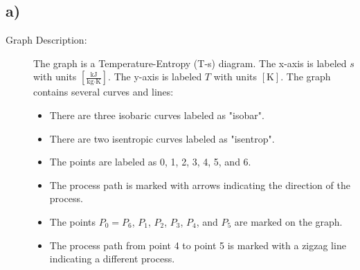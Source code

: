

\subsection*{a)}

\begin{description}
    \item[Graph Description:] The graph is a Temperature-Entropy (T-s) diagram. The x-axis is labeled \( s \) with units \([ \frac{\text{kJ}}{\text{kg} \cdot \text{K}} ]\). The y-axis is labeled \( T \) with units \([ \text{K} ]\). The graph contains several curves and lines:
    \begin{itemize}
        \item There are three isobaric curves labeled as "isobar".
        \item There are two isentropic curves labeled as "isentrop".
        \item The points are labeled as 0, 1, 2, 3, 4, 5, and 6.
        \item The process path is marked with arrows indicating the direction of the process.
        \item The points \( P_0 = P_6 \), \( P_1 \), \( P_2 \), \( P_3 \), \( P_4 \), and \( P_5 \) are marked on the graph.
        \item The process path from point 4 to point 5 is marked with a zigzag line indicating a different process.
    \end{itemize}
\end{description}